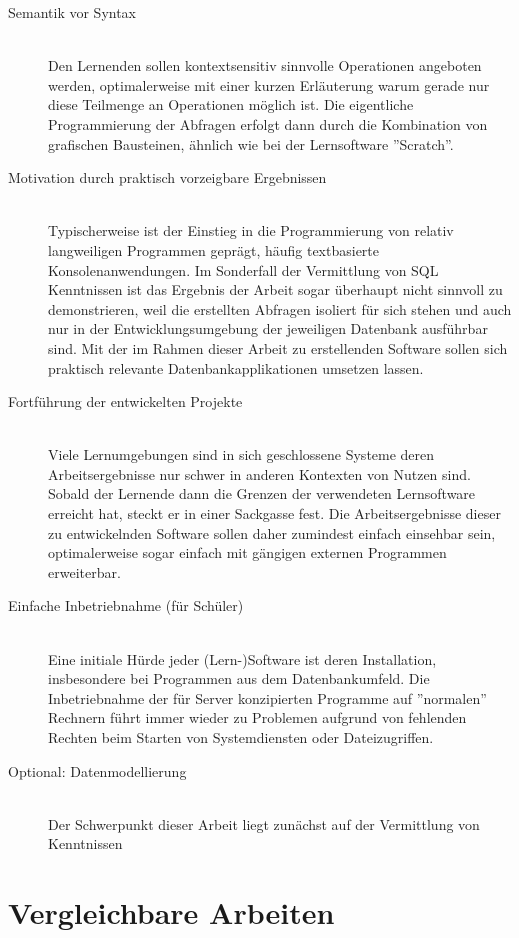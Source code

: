 \documentclass[paper=a4,fontsize=11pt,parskip=half]{scrartcl}
\begin{document}
\begin{description}
\item[Semantik vor Syntax] \hfill\\
  Den Lernenden sollen kontextsensitiv sinnvolle Operationen angeboten werden, optimalerweise mit einer kurzen Erläuterung warum gerade nur diese Teilmenge an Operationen möglich ist. Die eigentliche Programmierung der Abfragen erfolgt dann durch die Kombination von grafischen Bausteinen, ähnlich wie bei der Lernsoftware ''Scratch''.
\item[Motivation durch praktisch vorzeigbare Ergebnissen] \hfill\\
  Typischerweise ist der Einstieg in die Programmierung von relativ langweiligen Programmen geprägt, häufig textbasierte Konsolenanwendungen. Im Sonderfall der Vermittlung von SQL Kenntnissen ist das Ergebnis der Arbeit sogar überhaupt nicht sinnvoll zu demonstrieren, weil die erstellten Abfragen isoliert für sich stehen und auch nur in der Entwicklungsumgebung der jeweiligen Datenbank ausführbar sind. Mit der im Rahmen dieser Arbeit zu erstellenden Software sollen sich praktisch relevante Datenbankapplikationen umsetzen lassen.
\item[Fortführung der entwickelten Projekte] \hfill \\
  Viele Lernumgebungen sind in sich geschlossene Systeme deren Arbeitsergebnisse nur schwer in anderen Kontexten von Nutzen sind. Sobald der Lernende dann die Grenzen der verwendeten Lernsoftware erreicht hat, steckt er in einer Sackgasse fest. Die Arbeitsergebnisse dieser zu entwickelnden Software sollen daher zumindest einfach einsehbar sein, optimalerweise sogar einfach mit gängigen externen Programmen erweiterbar.
\item[Einfache Inbetriebnahme (für Schüler)] \hfill \\
  Eine initiale Hürde jeder (Lern-)Software ist deren Installation, insbesondere bei Programmen aus dem Datenbankumfeld. Die Inbetriebnahme der für Server konzipierten Programme auf ''normalen'' Rechnern führt immer wieder zu Problemen aufgrund von fehlenden Rechten beim Starten von Systemdiensten oder Dateizugriffen. 
\item[Optional: Datenmodellierung] \hfill \\
  Der Schwerpunkt dieser Arbeit liegt zunächst auf der Vermittlung von Kenntnissen
\end{description}

\section{Vergleichbare Arbeiten}
\end{document}
